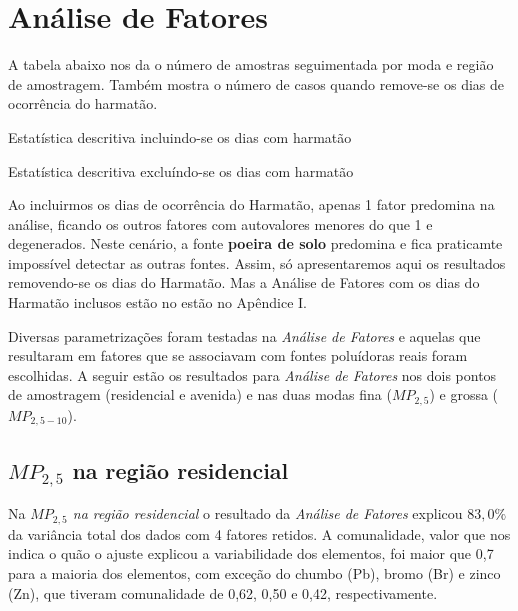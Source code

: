 \section{Análise de Fatores}

A tabela abaixo nos da o número de amostras seguimentada por
moda e região de amostragem. 
Também mostra o número de casos quando remove-se os dias de ocorrência do harmatão.

\begin{table}[H]
 \centering
  
  \caption{Estatística descritiva incluindo-se os dias com harmatão}
\end{table}

\begin{table}[H]
  \centering
  
  \caption{Estatística descritiva excluíndo-se os dias com harmatão}
\end{table}

Ao incluirmos os dias de ocorrência do Harmatão, apenas 1 fator
predomina na análise, ficando os outros fatores com autovalores
menores do que 1 e degenerados. Neste cenário, a fonte 
\textbf{poeira de solo} predomina e fica praticamte impossível
detectar as outras fontes. Assim, só apresentaremos aqui os resultados 
removendo-se os dias do Harmatão. Mas a Análise de Fatores com os
dias do Harmatão inclusos estão no estão no Apêndice I.

Diversas parametrizações foram testadas na \textit{Análise de Fatores}
e aquelas que resultaram em fatores que se associavam com fontes poluídoras
reais foram escolhidas. A seguir estão os resultados para 
\textit{Análise de Fatores} nos dois pontos de amostragem 
(residencial e avenida) e nas duas modas
fina ($MP_{2,5}$) e grossa ($MP_{2,5-10}$).


\subsection{$MP_{2,5}$ na região residencial}

Na \textit{$MP_{2,5}$ na região residencial} o resultado da 
\textit{Análise de Fatores}  explicou $83,0\%$ da variância total 
dos dados com 4 fatores retidos.
A comunalidade, valor que nos indica o quão o ajuste explicou
a variabilidade dos elementos, foi maior que 0,7 para a maioria dos elementos,
com exceção do chumbo (Pb), bromo (Br) e zinco (Zn), que tiveram comunalidade 
de 0,62, 0,50 e 0,42, respectivamente.

